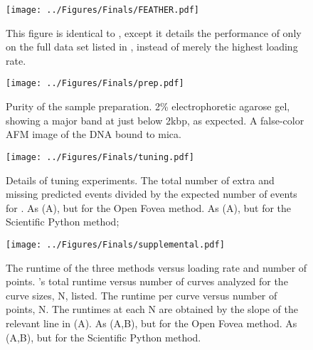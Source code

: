 \begin{figure}[htp]
\caption[Performance of \name{} on larger data set]{\noindent{}\pStartF This figure is identical to , except it details the performance of only \name{} on the full data set listed in , instead of merely the highest loading rate.  \pEndF }
\centering
\texttt{[image: ../Figures/Finals/FEATHER.pdf]}%
\end{figure}

\begin{figure}[htp]
\caption[Verification of sample purity]{\noindent{}\pStartF Purity of the sample preparation.  2\% electrophoretic agarose gel, showing a major band at just below 2kbp, as expected.  A false-color AFM image of the DNA bound to mica. \pEndF }
\centering
\texttt{[image: ../Figures/Finals/prep.pdf]}%
\end{figure}


\begin{figure}[htp]
\caption[Cross validation of algorithms and optimal parameters]{\noindent{}\pStartF Details of tuning experiments.  The total number of extra and missing predicted events divided by the expected number of events for \name{}.  As (A), but for the Open Fovea method.  As (A), but for the Scientific Python method; \pEndF }
\centering
\texttt{[image: ../Figures/Finals/tuning.pdf]}%
\end{figure}



\begin{figure}
\caption[Algorithmic runtime versus loading rate]{\noindent{}\pStartF The runtime of the three methods versus loading rate and number of points.  \name{}'s total runtime versus number of curves analyzed for the curve sizes, N, listed.  The runtime per curve versus number of points, N. The runtimes at each N are obtained by the slope of the relevant line in (A).   As (A,B), but for the Open Fovea method.  As (A,B), but for the Scientific Python method. \pEndF }
\centering
\texttt{[image: ../Figures/Finals/supplemental.pdf]}%
\end{figure}





%

%

%

